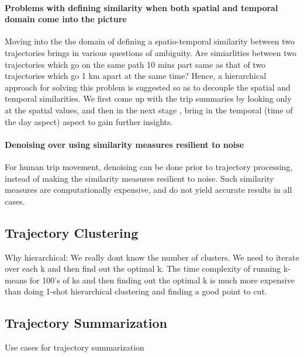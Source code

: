 \paragraph{Problems with defining similarity when both spatial and temporal domain come into the picture}

\par Moving into the the domain of defining a spatio-temporal similarity between two trajectories brings in various questions of ambiguity. Are simiarlities between two trajectories which go on the same path 10 mins part same as that of two trajectories which go 1 km apart at the same time? Hence, a hierarchical approach for solving this problem is suggested so as to decouple the spatial and temporal similarities. We first come up with the trip summaries by looking only at the spatial values, and then in the next stage , bring in the temporal (time of the day aspect) aspect to gain further insights.

\paragraph{Denoising over using similarity measures resilient to noise}
\par For human trip movement, denoising can be done prior to trajectory processing, instead of making the similarity measures resilient to noise. Such similarity measures are computationally expensive, and do not yield accurate results in all cases.

\subsection{Trajectory Clustering}

Why hierarchical: We really dont know the number of clusters. We need to iterate over each k and then find out the optimal k. The time complexity of running k-means for 100's of ks and then finding out the optimal k is much more expensive than doing 1-shot hierarchical clustering and finding a good point to cut. 

\subsection{Trajectory Summarization}

\par { Use cases for trajectory summarization}

